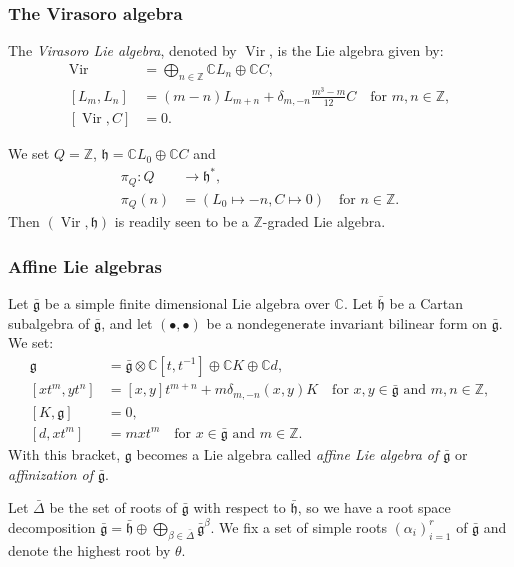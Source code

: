 \documentclass{beamer}
\DeclareMathOperator{\Vir}{Vir}
\begin{document}
\begin{frame}
  \frametitle{The Virasoro algebra}
  The \emph{Virasoro Lie algebra}, denoted by $\Vir$, is the Lie algebra given by:
  \begin{align*}
    \Vir &= \bigoplus_{n \in \mathbb{Z}}\mathbb{C}L_n \oplus \mathbb{C}C, \\
    [L_m, L_n] &= (m - n)L_{m + n} + \delta_{m, -n}\frac{m^3 - m}{12}C \quad \text{for $m, n \in \mathbb{Z}$}, \\
    [\Vir, C] &= 0.
  \end{align*}

  We set $Q = \mathbb{Z}$, $\mathfrak{h} = \mathbb{C}L_0 \oplus \mathbb{C}C$ and
  \begin{align*}
    \pi_Q: Q &\to \mathfrak{h}^*, \\
    \pi_Q(n) &= (L_0 \mapsto -n, C \mapsto 0) \quad \text{for $n \in \mathbb{Z}$}.
  \end{align*}
  Then $(\Vir, \mathfrak{h})$ is readily seen to be a $\mathbb{Z}$-graded Lie algebra.
\end{frame}

\begin{frame}
  \frametitle{Affine Lie algebras}
  Let $\bar{\mathfrak{g}}$ be a simple finite dimensional Lie algebra over $\mathbb{C}$.
  Let $\bar{\mathfrak{h}}$ be a Cartan subalgebra of $\bar{\mathfrak{g}}$, and let $(\bullet, \bullet)$ be a nondegenerate invariant bilinear form on $\bar{\mathfrak{g}}$.
  We set:
  \begin{align*}
    \mathfrak{g} &= \bar{\mathfrak{g}} \otimes \mathbb{C}[t, t^{-1}] \oplus \mathbb{C}K \oplus \mathbb{C}d, \\
    [xt^m, yt^n] &= [x, y]t^{m + n} + m\delta_{m, -n}(x, y)K \quad \text{for $x, y \in \bar{\mathfrak{g}}$ and $m, n \in \mathbb{Z}$},  \\
    [K, \mathfrak{g}] &= 0, \\
    [d, xt^m] &= mxt^m \quad \text{for $x \in \bar{\mathfrak{g}}$ and $m \in \mathbb{Z}$}.
  \end{align*}
  With this bracket, $\mathfrak{g}$ becomes a Lie algebra called \emph{affine Lie algebra of $\bar{\mathfrak{g}}$} or \emph{affinization of $\bar{\mathfrak{g}}$}.

  Let $\bar{\Delta}$ be the set of roots of $\bar{\mathfrak{g}}$ with respect to $\bar{\mathfrak{h}}$, so we have a root space decomposition $\bar{\mathfrak{g}} = \bar{\mathfrak{h}} \oplus \bigoplus_{\beta \in \bar{\Delta}}\bar{\mathfrak{g}}^{\beta}$.
  We fix a set of simple roots $(\alpha_i)_{i = 1}^r$ of $\bar{\mathfrak{g}}$ and denote the highest root by $\theta$.
\end{frame}
\end{document}
